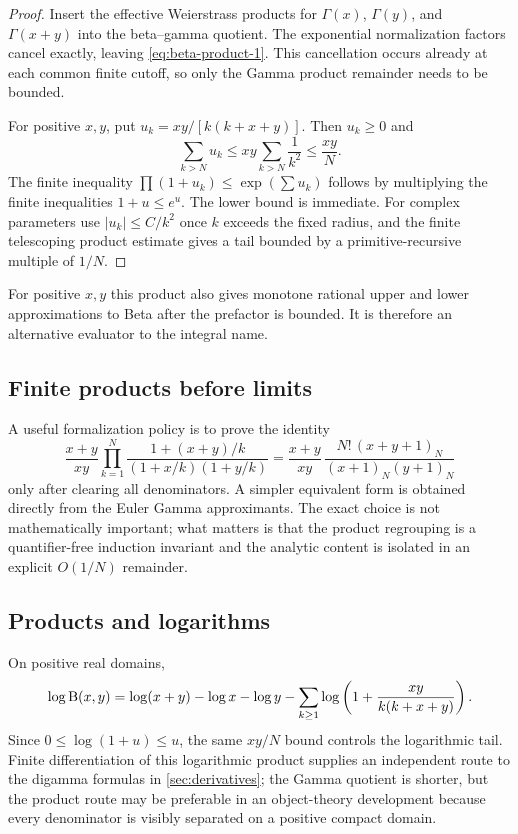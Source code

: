 \begin{proof}
Insert the effective Weierstrass products for $\Gamma(x)$, $\Gamma(y)$, and $\Gamma(x+y)$ into the beta--gamma quotient.  The exponential normalization factors cancel exactly, leaving \eqref{eq:beta-product-1}.  This cancellation occurs already at each common finite cutoff, so only the Gamma product remainder needs to be bounded.

For positive $x,y$, put $u_k=xy/[k(k+x+y)]$.  Then $u_k\ge0$ and
\[
 \sum_{k>N}u_k\le xy\sum_{k>N}\frac1{k^2}\le\frac{xy}{N}.
\]
The finite inequality $\prod(1+u_k)\le\exp(\sum u_k)$ follows by multiplying the finite inequalities $1+u\le e^u$.  The lower bound is immediate.  For complex parameters use $|u_k|\le C/k^2$ once $k$ exceeds the fixed radius, and the finite telescoping product estimate gives a tail bounded by a primitive-recursive multiple of $1/N$.
\end{proof}

For positive $x,y$ this product also gives monotone rational upper and lower approximations to Beta after the prefactor is bounded.  It is therefore an alternative evaluator to the integral name.

\subsection{Finite products before limits}

A useful formalization policy is to prove the identity
\[
 \frac{x+y}{xy}
 \prod_{k=1}^{N}
 \frac{1+(x+y)/k}{(1+x/k)(1+y/k)}
 =
 \frac{x+y}{xy}\,
 \frac{N!\,(x+y+1)_N}{(x+1)_N(y+1)_N}
\]
only after clearing all denominators.  A simpler equivalent form is obtained directly from the Euler Gamma approximants.  The exact choice is not mathematically important; what matters is that the product regrouping is a quantifier-free induction invariant and the analytic content is isolated in an explicit $O(1/N)$ remainder.

\subsection{Products and logarithms}

On positive real domains,
\[
 \log\mathrm B(x,y)=\log(x+y)-\log x-\log y
 -\sum_{k\ge1}\log\left(1+\frac{xy}{k(k+x+y)}\right).
\]
Since $0\le\log(1+u)\le u$, the same $xy/N$ bound controls the logarithmic tail.  Finite differentiation of this logarithmic product supplies an independent route to the digamma formulas in \cref{sec:derivatives}; the Gamma quotient is shorter, but the product route may be preferable in an object-theory development because every denominator is visibly separated on a positive compact domain.
